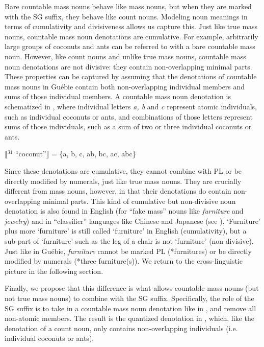 \documentclass[output=paper,colorlinks,citecolor=brown]{langscibook}
\begin{document}
Bare countable mass nouns behave like mass nouns, but when they are marked with the SG suffix, they behave like count nouns. Modeling noun meanings in terms of cumulativity and divisiveness allows us capture this. Just like true mass nouns, countable mass noun denotations are cumulative. For example, arbitrarily large groups of coconuts and ants can be referred to with a bare countable mass noun. However, like count nouns and unlike true mass nouns, countable mass noun denotations are not divisive: they contain non-overlapping minimal parts. These properties can be captured by assuming that the denotations of countable mass nouns in Guébie contain both non-overlapping individual members and sums of those individual members. A countable mass noun denotation is schematized in , where individual letters \textit{a, b} and \textit{c} represent atomic individuals, such as individual coconuts or ants, and combinations of those letters represent sums of those individuals, such as a sum of two or three individual coconuts or ants.%

\ea%
    \label{ex:sande:19}
    $\llbracket$$^{31}$ ``coconut''$\rrbracket$ = \{a, b, c, ab, bc, ac, abc\}
\z

Since these denotations are cumulative, they cannot combine with PL or be directly modified by numerals, just like true mass nouns. They are crucially different from mass nouns, however, in that their denotations do contain non-overlapping minimal parts. This kind of cumulative but non-divisive noun denotation is also found in English (for ``fake mass'' nouns like \textit{furniture} and \textit{jewelry}) and in ``classifier'' languages like Chinese and Japanese (see \citealt{Doetjes1997, Landman2011, Deal2017}). `Furniture' plus more `furniture' is still called `furniture' in English (cumulativity), but a sub-part of `furniture' such as the leg of a chair is not `furniture' (non-divisive). Just like in Guébie, \textit{furniture} cannot be marked PL (*furnitures) or be directly modified by numerals (*three furniture(s)). We return to the cross-linguistic picture in the following section.

Finally, we propose that this difference is what allows countable mass nouns (but not true mass nouns) to combine with the SG suffix. Specifically, the role of the SG suffix is to take in a countable mass noun denotation like in , and remove all non-atomic members. The result is the quantized denotation in , which, like the denotation of a count noun, only contains non-overlapping individuals (i.e. individual coconuts or ants).%
\end{document}

